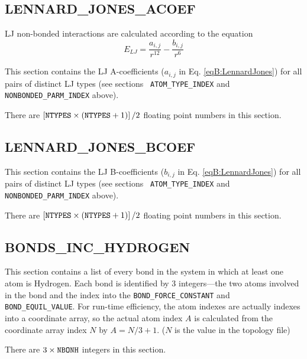 \subsection*{LENNARD\_JONES\_ACOEF}

LJ non-bonded interactions are calculated according to the equation
\begin{equation}
   E_{LJ} = \frac {a_{i,j}} {r ^ {12}} - \frac {b_{i,j}} {r ^ 6}
   \label{eqB:LennardJones}
\end{equation}

This section contains the LJ A-coefficients ($a_{i,j}$ in Eq.
\ref{eqB:LennardJones}) for all pairs of distinct LJ types (see sections {\tt
ATOM\_TYPE\_INDEX} and {\tt NONBONDED\_PARM\_INDEX} above).


\noindent There are $\left [ {\tt NTYPES} \times ( {\tt NTYPES} + 1 ) \right ] /
2$ floating point numbers in this section.

\subsection*{LENNARD\_JONES\_BCOEF}

This section contains the LJ B-coefficients ($b_{i,j}$ in Eq.
\ref{eqB:LennardJones}) for all pairs of distinct LJ types (see sections {\tt
ATOM\_TYPE\_INDEX} and {\tt NONBONDED\_PARM\_INDEX} above).


\noindent There are $\left [ {\tt NTYPES} \times ( {\tt NTYPES} + 1 ) \right ] /
2$ floating point numbers in this section.

\subsection*{BONDS\_INC\_HYDROGEN}

This section contains a list of every bond in the system in which at least one
atom is Hydrogen. Each bond is identified by 3 integers---the two atoms involved
in the bond and the index into the {\tt BOND\_FORCE\_CONSTANT} and {\tt
BOND\_EQUIL\_VALUE}. For run-time efficiency, the atom indexes are actually
indexes into a coordinate array, so the actual atom index $A$ is calculated from
the coordinate array index $N$ by $A = N / 3 + 1$. ($N$ is the value in the
topology file)


\noindent There are $3 \times {\tt NBONH}$ integers in this section.

